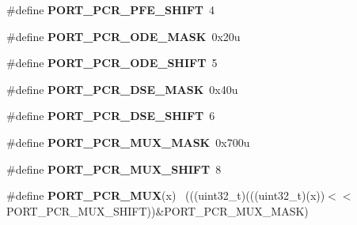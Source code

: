 \begin{DoxyCompactItemize}
\item 
\hypertarget{group___p_o_r_t___register___masks_gae7d057ebd3218784fca57f55a85f2d29}{}\#define {\bfseries P\+O\+R\+T\+\_\+\+P\+C\+R\+\_\+\+P\+F\+E\+\_\+\+S\+H\+I\+F\+T}~4\label{group___p_o_r_t___register___masks_gae7d057ebd3218784fca57f55a85f2d29}

\item 
\hypertarget{group___p_o_r_t___register___masks_gacbe19f0087a51a8c26c51838b7a555d2}{}\#define {\bfseries P\+O\+R\+T\+\_\+\+P\+C\+R\+\_\+\+O\+D\+E\+\_\+\+M\+A\+S\+K}~0x20u\label{group___p_o_r_t___register___masks_gacbe19f0087a51a8c26c51838b7a555d2}

\item 
\hypertarget{group___p_o_r_t___register___masks_gac4871a3c3a20a51a3a57131d34e427e0}{}\#define {\bfseries P\+O\+R\+T\+\_\+\+P\+C\+R\+\_\+\+O\+D\+E\+\_\+\+S\+H\+I\+F\+T}~5\label{group___p_o_r_t___register___masks_gac4871a3c3a20a51a3a57131d34e427e0}

\item 
\hypertarget{group___p_o_r_t___register___masks_gae1c37b9f66e58bd80e7764232fd05cee}{}\#define {\bfseries P\+O\+R\+T\+\_\+\+P\+C\+R\+\_\+\+D\+S\+E\+\_\+\+M\+A\+S\+K}~0x40u\label{group___p_o_r_t___register___masks_gae1c37b9f66e58bd80e7764232fd05cee}

\item 
\hypertarget{group___p_o_r_t___register___masks_ga00ae08038ade5432d0240666658d8867}{}\#define {\bfseries P\+O\+R\+T\+\_\+\+P\+C\+R\+\_\+\+D\+S\+E\+\_\+\+S\+H\+I\+F\+T}~6\label{group___p_o_r_t___register___masks_ga00ae08038ade5432d0240666658d8867}

\item 
\hypertarget{group___p_o_r_t___register___masks_ga0feec5fc6b285b83c573f913c74e5c41}{}\#define {\bfseries P\+O\+R\+T\+\_\+\+P\+C\+R\+\_\+\+M\+U\+X\+\_\+\+M\+A\+S\+K}~0x700u\label{group___p_o_r_t___register___masks_ga0feec5fc6b285b83c573f913c74e5c41}

\item 
\hypertarget{group___p_o_r_t___register___masks_gaa39e1cfed4df3797e4f1d141adab8776}{}\#define {\bfseries P\+O\+R\+T\+\_\+\+P\+C\+R\+\_\+\+M\+U\+X\+\_\+\+S\+H\+I\+F\+T}~8\label{group___p_o_r_t___register___masks_gaa39e1cfed4df3797e4f1d141adab8776}

\item 
\hypertarget{group___p_o_r_t___register___masks_gad20ae957ec775096862e8a6542463e03}{}\#define {\bfseries P\+O\+R\+T\+\_\+\+P\+C\+R\+\_\+\+M\+U\+X}(x)                                                ~(((uint32\+\_\+t)(((uint32\+\_\+t)(x))$<$$<$P\+O\+R\+T\+\_\+\+P\+C\+R\+\_\+\+M\+U\+X\+\_\+\+S\+H\+I\+F\+T))\&P\+O\+R\+T\+\_\+\+P\+C\+R\+\_\+\+M\+U\+X\+\_\+\+M\+A\+S\+K)\label{group___p_o_r_t___register___masks_gad20ae957ec775096862e8a6542463e03}


\end{DoxyCompactItemize}
